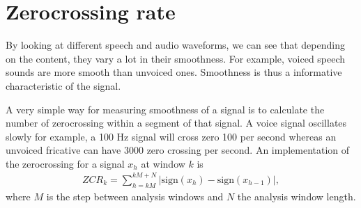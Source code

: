 \documentclass[letterpaper,10pt,english]{jupyterBook}
\begin{document}
\sphinxAtStartPar
{}

\sphinxstepscope


\section{Zero\sphinxhyphen{}crossing rate}
\label{\detokenize{Representations/Zero-crossing_rate:zero-crossing-rate}}\label{\detokenize{Representations/Zero-crossing_rate::doc}}
\sphinxAtStartPar
By looking at different speech and audio waveforms, we can see that
depending on the content, they vary a lot in their smoothness. For
example, voiced speech sounds are more smooth than unvoiced ones.
Smoothness is thus a informative characteristic of the signal.

\sphinxAtStartPar
A very simple way for measuring smoothness of a signal is to calculate
the number of zero\sphinxhyphen{}crossing within a segment of that signal. A voice
signal oscillates slowly \sphinxhyphen{} for example, a 100 Hz signal will cross zero
100 per second \sphinxhyphen{} whereas an unvoiced fricative can have 3000 zero
crossing per second. An implementation of the zero\sphinxhyphen{}crossing for a signal \(x_h\) at window \(k\) is
\begin{equation*}
\begin{split}
ZCR_k = \sum_{h=kM}^{kM+N} \left|{\mathrm{sign}}(x_h)-{\mathrm{sign}}(x_{h-1})\right|,
\end{split}
\end{equation*}
\sphinxAtStartPar
where \(M\) is the step between analysis windows and \(N\) the analysis window length.
\end{document}
